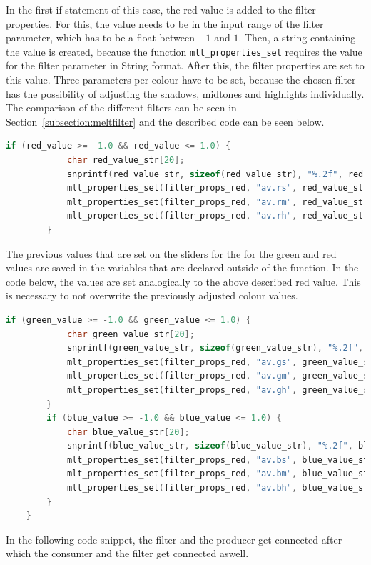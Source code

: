 \documentclass[../MasterThesis.tex]{subfiles}
\begin{document}
In the first if statement of this case, the red value is added to the filter properties. For this, the value needs to be in the input range of the filter parameter, which has to be a float between $-1$ and $1$. Then, a string containing the value is created, because the function \texttt{mlt\_properties\_set} requires the value for the filter parameter in String format. After this, the filter properties are set to this value. Three parameters per colour have to be set, because the chosen filter has the possibility of adjusting the shadows, midtones and highlights individually. 
The comparison of the different filters can be seen in Section~\ref{subsection:meltfilter} and the described code can be seen below.


\begin{lstlisting}[language=c, numbers=none, columns=fullflexible]
		if (red_value >= -1.0 && red_value <= 1.0) {
			char red_value_str[20]; 
			snprintf(red_value_str, sizeof(red_value_str), "%.2f", red_value);
			mlt_properties_set(filter_props_red, "av.rs", red_value_str);
			mlt_properties_set(filter_props_red, "av.rm", red_value_str);
			mlt_properties_set(filter_props_red, "av.rh", red_value_str);
		}	
\end{lstlisting}

The previous values that are set on the sliders for the for the green and red values are saved in the variables that are declared outside of the function. In the code below, the values are set analogically to the above described red value. This is necessary to not overwrite the previously adjusted colour values.
	
\begin{lstlisting}[language=c, numbers=none, columns=fullflexible]
		if (green_value >= -1.0 && green_value <= 1.0) {
			char green_value_str[20]; 
			snprintf(green_value_str, sizeof(green_value_str), "%.2f", green_value);
			mlt_properties_set(filter_props_red, "av.gs", green_value_str);
			mlt_properties_set(filter_props_red, "av.gm", green_value_str);	
			mlt_properties_set(filter_props_red, "av.gh", green_value_str);
		} 			
		if (blue_value >= -1.0 && blue_value <= 1.0) {
			char blue_value_str[20]; 
			snprintf(blue_value_str, sizeof(blue_value_str), "%.2f", blue_value);
			mlt_properties_set(filter_props_red, "av.bs", blue_value_str);
			mlt_properties_set(filter_props_red, "av.bm", blue_value_str);	
			mlt_properties_set(filter_props_red, "av.bh", blue_value_str);
		}					
	}
\end{lstlisting}

In the following code snippet, the filter and the producer get connected after which the consumer and the filter get connected aswell.
\end{document}
